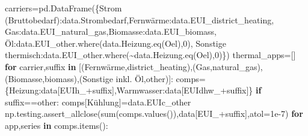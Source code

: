 \documentclass[
  ngerman,
  a4paper,
  DIV=11]{scrreprt}
\newenvironment{Shaded}{\begin{snugshade}}{\end{snugshade}}
\newcommand{\BuiltInTok}[1]{\textcolor[rgb]{0.00,0.23,0.31}{#1}}
\newcommand{\ControlFlowTok}[1]{\textcolor[rgb]{0.00,0.23,0.31}{\textbf{#1}}}
\newcommand{\DecValTok}[1]{\textcolor[rgb]{0.68,0.00,0.00}{#1}}
\newcommand{\FloatTok}[1]{\textcolor[rgb]{0.68,0.00,0.00}{#1}}
\newcommand{\KeywordTok}[1]{\textcolor[rgb]{0.00,0.23,0.31}{\textbf{#1}}}
\newcommand{\NormalTok}[1]{\textcolor[rgb]{0.00,0.23,0.31}{#1}}
\newcommand{\OperatorTok}[1]{\textcolor[rgb]{0.37,0.37,0.37}{#1}}
\newcommand{\StringTok}[1]{\textcolor[rgb]{0.13,0.47,0.30}{#1}}
\begin{document}
\begin{Shaded}
\begin{Highlighting}[]
\NormalTok{carriers}\OperatorTok{=}\NormalTok{pd.DataFrame(\{}\StringTok{\textquotesingle{}Strom (Bruttobedarf)\textquotesingle{}}\NormalTok{:data.Strombedarf,}\StringTok{\textquotesingle{}Fernwärme\textquotesingle{}}\NormalTok{:data.EUI\_district\_heating,}
 \StringTok{\textquotesingle{}Gas\textquotesingle{}}\NormalTok{:data.EUI\_natural\_gas,}\StringTok{\textquotesingle{}Biomasse\textquotesingle{}}\NormalTok{:data.EUI\_biomass,}
 \StringTok{\textquotesingle{}Öl\textquotesingle{}}\NormalTok{:data.EUI\_other.where(data.Heizung.eq(}\StringTok{\textquotesingle{}Oel\textquotesingle{}}\NormalTok{),}\DecValTok{0}\NormalTok{),}
 \StringTok{\textquotesingle{}Sonstige thermisch\textquotesingle{}}\NormalTok{:data.EUI\_other.where(}\OperatorTok{\textasciitilde{}}\NormalTok{data.Heizung.eq(}\StringTok{\textquotesingle{}Oel\textquotesingle{}}\NormalTok{),}\DecValTok{0}\NormalTok{)\})}
\NormalTok{thermal\_apps}\OperatorTok{=}\NormalTok{[]}
\ControlFlowTok{for}\NormalTok{ carrier,suffix }\KeywordTok{in}\NormalTok{ [(}\StringTok{\textquotesingle{}Fernwärme\textquotesingle{}}\NormalTok{,}\StringTok{\textquotesingle{}district\_heating\textquotesingle{}}\NormalTok{),(}\StringTok{\textquotesingle{}Gas\textquotesingle{}}\NormalTok{,}\StringTok{\textquotesingle{}natural\_gas\textquotesingle{}}\NormalTok{),(}\StringTok{\textquotesingle{}Biomasse\textquotesingle{}}\NormalTok{,}\StringTok{\textquotesingle{}biomass\textquotesingle{}}\NormalTok{),(}\StringTok{\textquotesingle{}Sonstige inkl. Öl\textquotesingle{}}\NormalTok{,}\StringTok{\textquotesingle{}other\textquotesingle{}}\NormalTok{)]:}
\NormalTok{    comps}\OperatorTok{=}\NormalTok{\{}\StringTok{\textquotesingle{}Heizung\textquotesingle{}}\NormalTok{:data[}\StringTok{\textquotesingle{}EUIh\_\textquotesingle{}}\OperatorTok{+}\NormalTok{suffix],}\StringTok{\textquotesingle{}Warmwasser\textquotesingle{}}\NormalTok{:data[}\StringTok{\textquotesingle{}EUIdhw\_\textquotesingle{}}\OperatorTok{+}\NormalTok{suffix]\}}
    \ControlFlowTok{if}\NormalTok{ suffix}\OperatorTok{==}\StringTok{\textquotesingle{}other\textquotesingle{}}\NormalTok{: comps[}\StringTok{\textquotesingle{}Kühlung\textquotesingle{}}\NormalTok{]}\OperatorTok{=}\NormalTok{data.EUIc\_other}
\NormalTok{    np.testing.assert\_allclose(}\BuiltInTok{sum}\NormalTok{(comps.values()),data[}\StringTok{\textquotesingle{}EUI\_\textquotesingle{}}\OperatorTok{+}\NormalTok{suffix],atol}\OperatorTok{=}\FloatTok{1e{-}7}\NormalTok{)}
    \ControlFlowTok{for}\NormalTok{ app,series }\KeywordTok{in}\NormalTok{ comps.items():}

\end{Highlighting}
\end{Shaded}
\end{document}
